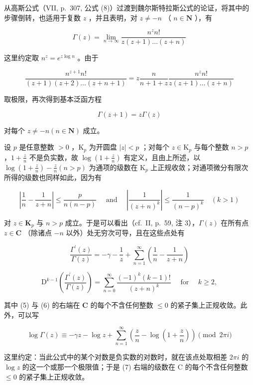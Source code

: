从高斯公式（VII, p.~307, 公式 (8)）过渡到魏尔斯特拉斯公式的论证，将其中的步骤倒转，也适用于复数 \(z\) ，并且表明，对 \(z \neq -n\) （ \(n \in \mathbf{N}\) ），有

\[
\Gamma (z) = \lim _ {n \rightarrow \infty} \frac {n ^ {z} n !}{z (z + 1) \dots (z + n)}\tag{3}
\]

这里约定取 \(n^z = e^{z\log n}\) 。由于

\[
\frac {n ^ {z + 1} n !}{(z + 1) (z + 2) \dots (z + n + 1)} = z \frac {n}{n + 1 + z} \frac {n ^ {z} n !}{z (z + 1) \dots (z + n)}
\]

取极限，再次得到基本泛函方程

\[
\Gamma (z + 1) = z \Gamma (z)\tag{4}
\]

对每个 \(z \neq -n (n \in \mathbf{N})\) 成立。

设 \(p\) 是任意整数 \(> 0\) ，\(\mathrm{K}_p\) 为开圆盘 \(|z| < p\) ；对每个 \(z \in \mathrm{K}_p\) 与每个整数 \(n > p\) ，\(1 + \frac{z}{n}\) 不是负实数，故 \(\log \left(1 + \frac{z}{n}\right)\) 有定义，且由上所述，以 \(\log \left(1 + \frac{z}{n}\right) - \frac{z}{n} (n > p)\) 为通项的级数在 \(\mathrm{K}_p\) 上正规收敛；对通项微分有限次所得的级数也同样如此，因为有

\[
\left| \frac {1}{n} - \frac {1}{z + n} \right| \leqslant \frac {p}{n (n - p)} \quad \text { and } \quad \left| \frac {1}{(z + n) ^ {k}} \right| \leqslant \frac {1}{(n - p) ^ {k}} \quad (k > 1)
\]

对 \(z \in \mathbf{K}_p\) 与 \(n > p\) 成立。于是可以看出（cf.~II, p.~59, 注 3），\(\Gamma(z)\) 在所有点 \(z \in \mathbf{C}\) （除诸点 \(-n\) 以外）处无穷次可导，且在这些点处有

\[
{\frac {\Gamma^ {\prime} (z)}{\Gamma (z)}} = - \gamma - {\frac {1}{z}} + \sum_ {n = 1} ^ {\infty} \left({\frac {1}{n}} - {\frac {1}{z + n}}\right)\tag{5}
\]

\[
\mathrm{D} ^ {k - 1} \left(\frac {\Gamma^ {\prime} (z)}{\Gamma (z)}\right) = \sum_ {n = 0} ^ {\infty} \frac {(- 1) ^ {k} (k - 1) !}{(z + n) ^ {k}} \quad \text { for } \quad k \geqslant 2,\tag{6}
\]

其中 (5) 与 (6) 的右端在 \(\mathbf{C}\) 的每个不含任何整数 \(\leqslant 0\) 的紧子集上正规收敛。此外，可以写

\[
\log \Gamma (z) \equiv - \gamma z - \log z + \sum_ {n = 1} ^ {\infty} \left(\frac {z}{n} - \log \left(1 + \frac {z}{n}\right)\right) \pmod {2 \pi i}\tag{7}
\]

这里约定：当此公式中的某个对数是负实数的对数时，就在该点处取相差 \(2\pi i\) 的 \(\log z\) 的这一个或那一个极限值；于是 (7) 右端的级数在 C 的每个不含任何整数 \(\leqslant 0\) 的紧子集上正规收敛。


